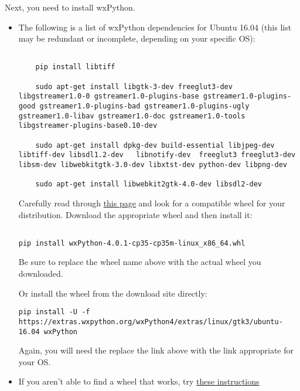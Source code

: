 \documentclass[11pt]{article}
\begin{document}
Next, you need to install wxPython.

\begin{itemize}
  \item The following is a list of wxPython dependencies for Ubuntu 16.04 (this list may be redundant or incomplete, depending on your specific OS):

  \begin{verbatim}

    pip install libtiff

    sudo apt-get install libgtk-3-dev freeglut3-dev libgstreamer1.0-0 gstreamer1.0-plugins-base gstreamer1.0-plugins-good gstreamer1.0-plugins-bad gstreamer1.0-plugins-ugly gstreamer1.0-libav gstreamer1.0-doc gstreamer1.0-tools libgstreamer-plugins-base0.10-dev

    sudo apt-get install dpkg-dev build-essential libjpeg-dev  libtiff-dev libsdl1.2-dev   libnotify-dev  freeglut3 freeglut3-dev libsm-dev libwebkitgtk-3.0-dev libxtst-dev python-dev libpng-dev

    sudo apt-get install libwebkit2gtk-4.0-dev libsdl2-dev
\end{verbatim}


Carefully read through \href{https://wxpython.org/pages/downloads/}{this page} and look for a compatible wheel for your distribution.  Download the appropriate wheel and then install it:
\begin{verbatim}

pip install wxPython-4.0.1-cp35-cp35m-linux_x86_64.whl

\end{verbatim}

Be sure to replace the wheel name above with the actual wheel you downloaded.

Or install the wheel from the download site directly:
\begin{verbatim}
pip install -U -f https://extras.wxpython.org/wxPython4/extras/linux/gtk3/ubuntu-16.04 wxPython

\end{verbatim}

Again, you will need the replace the link above with the link appropriate for your OS.

\item If you aren't able to find a wheel that works, try \href{https://wxpython.org/blog/2017-08-17-builds-for-linux-with-pip/}{these instructions}

\end{itemize}
\end{document}
